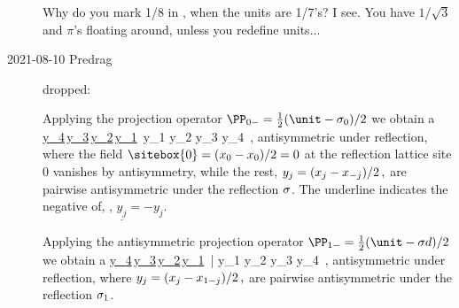 \begin{description}
         {
Why do you mark 1/8 in
, when the
units are 1/7's? I see. You have $1/\sqrt{3}$ and $\pi$'s floating
around, unless you redefine units...
    }




\item[2021-08-10 Predrag]
dropped:

Applying the projection operator
\(
\PP_{{0}-} = \frac{1}{2} (\unit-\Refl_{0})/2
\)
we obtain
a {\lattstate}
\beq
\cdots
\underline{{y}_{4}}\,\underline{{y}_{3}}\,\underline{{y}_{2}}\,\underline{{y}_{1}}\,
      {y}_{1} {y}_{2} {y}_{3} {y}_{4}  \cdots
\,,
antisymmetric under reflection, where the
field
\(
\sitebox{0} =(\ssp_0-\ssp_0)/2 =0
\)
at the reflection lattice site $0$ vanishes by antisymmetry, while the rest,
\(
{y}_{j} =(x_{j}-x_{-j})/2
\,,
\)
are pairwise antisymmetric under the reflection $\sigma$. The underline
indicates the negative of, \ie, $\underline{{y}_{j}}=-{y}_{j}$.

Applying the antisymmetric projection operator
\(
\PP_{{1}-} = \frac{1}{2} (\unit-\Refl\shift)/2
\)
we obtain a {\lattstate}
\beq
\cdots
\underline{{y}_{4}}\,\underline{{y}_{3}}\,\underline{{y}_{2}}\,\underline{{y}_{1}}\,
        |
      {y}_{1} {y}_{2} {y}_{3} {y}_{4}  \cdots
\,,
antisymmetric under reflection, where
\(
{y}_{j} =(x_{j}-x_{1-j})/2
\,,
\)
are pairwise antisymmetric under the reflection $\sigma_{1}$.


\end{description}
